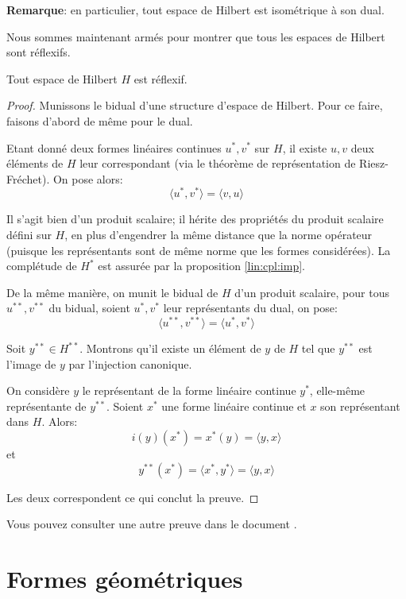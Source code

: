 \textbf{Remarque}: en particulier, tout espace de Hilbert
est isométrique à son dual.

Nous sommes maintenant armés pour montrer que tous les espaces
de Hilbert sont réflexifs.

\begin{thm}
  Tout espace de Hilbert $H$ est réflexif.
\end{thm}

\begin{proof}
  Munissons le bidual d'une structure d'espace de Hilbert.
  Pour ce faire, faisons d'abord de même pour le dual.

  Etant donné deux formes linéaires continues $u^*, v^*$ sur $H$,
  il existe $u, v$ deux éléments de $H$ leur correspondant (via
  le théorème de représentation de Riesz-Fréchet). On pose
  alors:
  $$\langle u^*, v^*\rangle = \langle v, u \rangle$$

  Il s'agit bien d'un produit scalaire; il hérite des
  propriétés du produit scalaire défini sur $H$, en plus
  d'engendrer la même distance que la norme opérateur
  (puisque les représentants sont de même norme que
  les formes considérées). La complétude de $H^*$
  est assurée par la proposition \ref{lin:cpl:imp}.

  De la même manière, on munit le bidual de $H$ d'un
  produit scalaire, pour tous $u^{**}, v^{**}$ du bidual,
  soient $u^*, v^*$ leur représentants du dual, on pose:
    $$\langle u^{**}, v^{**}\rangle = \langle u^*, v^* \rangle$$

  Soit $y^{**}\in H^{**}$. Montrons qu'il existe un élément
  de $y$ de $H$ tel que $y^{**}$ est l'image de $y$ par
  l'injection canonique.

  On considère $y$ le représentant de la forme linéaire continue
  $y^*$, elle-même représentante de $y^{**}$. Soient $x^*$ une forme
  linéaire continue et $x$ son représentant dans $H$. Alors:
  $$i(y)(x^*) = x^*(y) = \langle y, x\rangle$$
  et
  $$y^{**}(x^*) = \langle x^*, y^{*} \rangle = \langle y, x\rangle$$

  Les deux correspondent ce qui  conclut la preuve.

\end{proof}

Vous pouvez consulter une autre preuve dans le document
\cite[p.~49]{refl:hilbert}.

\section{Formes géométriques}
